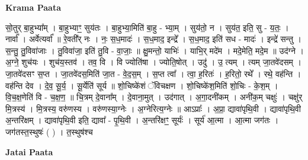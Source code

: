 \documentclass[17pt]{extarticle}
\begin{document}
\textbf{Krama Paata} \newline

सो॒तुर् बा॒हुभ्या᳚म् । बा॒हुभ्याꣳ॒॒ सुय॑तः । बा॒हुभ्या॒मिति॑ बा॒हु - भ्या॒म् । सुय॑तो॒ न । सुय॑त॒ इति॒ सु - य॒तः॒ । नार्वा᳚ । अर्वेत्यर्वा᳚ ॥ रे॒वती᳚र् नः । नः॒ स॒ध॒मादः॑ । स॒ध॒माद॒ इन्द्रे᳚ । स॒ध॒माद॒ इति॑ सध - मादः॑ । इन्द्रे॑ सन्तु । स॒न्तु॒ तु॒विवा॑जाः । तु॒विवा॑जा॒ इति॑ तु॒वि - वा॒जाः॒ ॥ क्षु॒मन्तो॒ याभिः॑ । याभि॒र् मदे॑म । मदे॒मेति॒ मदे॒म ॥ उद॑ग्ने । अ॒ग्ने॒ शुच॑यः । शुच॑य॒स्तव॑ । तव॒ वि । वि ज्योति॑षा । ज्योति॒षोत् । उदु॑ । उ॒ त्यम् । त्यम् जा॒तवे॑दसम् । जा॒तवे॑दसꣳ स॒प्त । जा॒तवे॑दस॒मिति॑ जा॒त - वे॒द॒स॒म् । स॒प्त त्वा᳚ । त्वा॒ ह॒रितः॑ । ह॒रितो॒ रथे᳚ । रथे॒ वह॑न्ति । वह॑न्ति देव । दे॒व॒ सू॒र्य॒ । सू॒र्येति॑ सूर्य ॥ शो॒चिष्के॑शं ॅविचक्षण । शो॒चिष्के॑श॒मिति॑ शो॒चिः - के॒श॒म् । वि॒च॒क्ष॒णेति॑ वि - च॒क्ष॒ण॒ ॥ चि॒त्रम् दे॒वाना᳚म् । दे॒वाना॒मुत् । उद॑गात् । अ॒गा॒दनी॑कम् । अनी॑क॒म् चक्षुः॑ । चक्षु॑र् मि॒त्रस्य॑ । मि॒त्रस्य॒ वरु॑णस्य । वरु॑णस्या॒ग्नेः । अ॒ग्नेरित्य॒ग्नेः ॥ आऽप्राः᳚ । अ॒प्रा॒ द्यावा॑पृथि॒वी । द्यावा॑पृथि॒वी अ॒न्तरि॑क्षम् । द्यावा॑पृथि॒वी इति॒ द्यावा᳚ - पृ॒थि॒वी । अ॒न्तरि॑क्षꣳ॒॒ सूर्यः॑ । सूर्य॑ आ॒त्मा । आ॒त्मा जग॑तः । जग॑तस्त॒स्थुषः॑ ( ) । त॒स्थुष॑श्च \newline

\textbf{Jatai Paata} \newline
\end{document}
